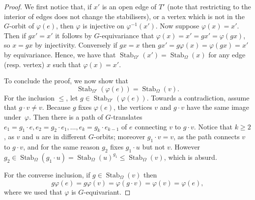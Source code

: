 \documentclass[10pt,a4paper]{amsart}
\newcommand{\Stab}[2]{\operatorname{Stab}_{#1}\left(#2\right)}
\renewcommand{\phi}{\varphi}
\begin{document}
\begin{proof}
We first notice that, if $x'$ is an open edge of $T'$ (note that restricting to the interior of edges does not change the stabilisers), or a vertex which is not in the $G$-orbit of $\phi(e)$, then $\phi$ is injective on $\phi^{-1}(x')$. Now suppose $\phi(x) = x'$. Then if $gx' = x'$ it follows by $G$-equivariance that $\phi(x)= x'= gx' = \phi(gx)$, so $x = gx$ by injectivity. Conversely if $gx = x$ then $gx' = g\phi(x) = \phi(gx) = x'$ by equivariance. Hence, we have that $\Stab{\Omega'}{x'}=\Stab{\Omega}{x}$ for any edge (resp. vertex) $x$ such that $\phi(x) = x'$.

    
To conclude the proof, we now show that
\begin{equation}\label{eq:stab_phi(e)}
    \Stab{\Omega'}{\phi(e)}=\Stab{\Omega}{v}.
\end{equation}
    For the inclusion $\le$, let $g\in \Stab{\Omega'}{\phi(e)}$. Towards a contradiction, assume that $g\cdot v\neq v$. Because $g$ fixes $\phi(e)$, the vertices $v$ and $g\cdot v$ have the same image under~$\phi$. Then there is a path of $G$-translates $e_1=g_1\cdot e, e_2=g_2\cdot e_1,\ldots, e_k=g_k \cdot e_{k-1}$ of $e$ connecting $v$ to $g\cdot v$. Notice that $k\ge 2$, as $v$ and $u$ are in different $G$-orbits; moreover $g_1\cdot v=v$, as the path connects $v$ to $g\cdot v$, and for the same reason $g_2$ fixes $g_1 \cdot u$ but not $v$. However $g_2 \in \Stab{\Omega}{g_1 \cdot u}=\Stab{\Omega}{u}^{g_1}\le \Stab{\Omega}{v}$, which is absurd.

    For the converse inclusion, if $g\in \Stab{\Omega}{v}$ then $$g\phi(e)=g\phi(v)=\phi(g\cdot v)=\phi(v)=\phi(e),$$
    where we used that $\phi$ is $G$-equivariant.
\end{proof}
\end{document}
